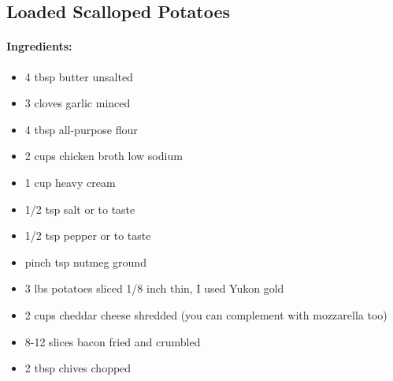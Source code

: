 \documentclass{article}
\begin{document}
\subsection{Loaded Scalloped Potatoes}

\paragraph{Ingredients:}
\begin{itemize}
\item 4 tbsp butter unsalted
\item 3 cloves garlic minced
\item 4 tbsp all-purpose flour
\item 2 cups chicken broth low sodium
\item 1 cup heavy cream
\item 1/2 tsp salt or to taste
\item 1/2 tsp pepper or to taste
\item pinch tsp nutmeg ground
\item 3 lbs potatoes sliced 1/8 inch thin, I used Yukon gold
\item 2 cups cheddar cheese shredded (you can complement with mozzarella too)
\item 8-12 slices bacon fried and crumbled
\item 2 tbsp chives chopped
\end{itemize}
\end{document}
